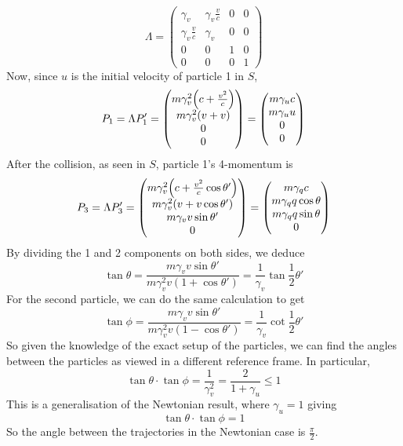 \[
	\Lambda = \begin{pmatrix}
		\gamma_v             & \gamma_v \frac{v}{c} & 0 & 0 \\
		\gamma_v \frac{v}{c} & \gamma_v             & 0 & 0 \\
		0                    & 0                    & 1 & 0 \\
		0                    & 0                    & 0 & 1
	\end{pmatrix}
\]
Now, since \(u\) is the initial velocity of particle 1 in \(S\),
\[
	P_1 = \Lambda P_1' = \begin{pmatrix}
		m\gamma_v^2 \qty(c + \frac{v^2}{c}) \\
		m\gamma_v^2 (v+v)                   \\
		0                                   \\
		0
	\end{pmatrix} = \begin{pmatrix}
		m\gamma_u c \\
		m\gamma_u u \\
		0           \\
		0
	\end{pmatrix}
\]
After the collision, as seen in \(S\), particle 1's 4-momentum is
\[
	P_3 = \Lambda P_3' = \begin{pmatrix}
		m\gamma_v^2 \qty(c + \frac{v^2}{c}\cos\theta') \\
		m\gamma_v^2 \qty(v + v\cos\theta')             \\
		m\gamma_v v\sin\theta'                         \\
		0
	\end{pmatrix} = \begin{pmatrix}
		m\gamma_q c           \\
		m\gamma_q q\cos\theta \\
		m\gamma_q q\sin\theta \\
		0
	\end{pmatrix}
\]
By dividing the 1 and 2 components on both sides, we deduce
\[
	\tan\theta = \frac{m\gamma_v v\sin\theta'}{m\gamma_v^2 v(1 + \cos\theta')} = \frac{1}{\gamma_v} \tan\frac{1}{2}\theta'
\]
For the second particle, we can do the same calculation to get
\[
	\tan\phi = \frac{m\gamma_v v\sin\theta'}{m\gamma_v^2 v(1 - \cos\theta')} = \frac{1}{\gamma_v} \cot\frac{1}{2}\theta'
\]
So given the knowledge of the exact setup of the particles, we can find the angles between the particles as viewed in a different reference frame.
In particular,
\[
	\tan\theta \cdot \tan\phi = \frac{1}{\gamma_v^2} = \frac{2}{1+\gamma_u} \leq 1
\]
This is a generalisation of the Newtonian result, where \(\gamma_u = 1\) giving
\[
	\tan\theta \cdot \tan\phi = 1
\]
So the angle between the trajectories in the Newtonian case is \(\frac{\pi}{2}\).

